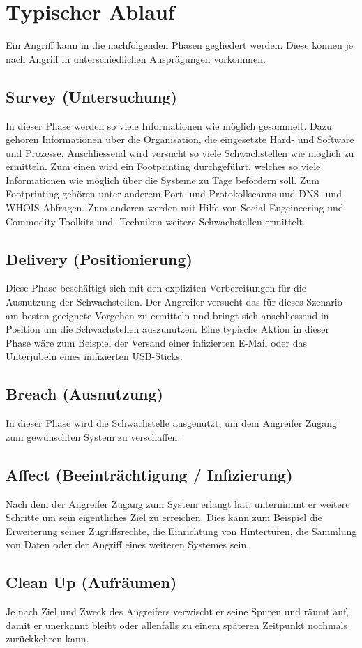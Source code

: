 \section{Typischer Ablauf}
Ein Angriff kann in die nachfolgenden Phasen gegliedert werden. Diese können je nach Angriff in unterschiedlichen Ausprägungen vorkommen.

\subsection{Survey (Untersuchung)}
In dieser Phase werden so viele Informationen wie möglich gesammelt. Dazu gehören Informationen über die Organisation, die eingesetzte Hard- und Software und Prozesse. Anschliessend wird versucht so viele Schwachstellen wie möglich zu ermitteln. Zum einen wird ein Footprinting durchgeführt, welches so viele Informationen wie möglich über die Systeme zu Tage befördern soll. Zum Footprinting gehören unter anderem Port- und Protokollscanns und DNS- und WHOIS-Abfragen. Zum anderen werden mit Hilfe von Social Engeineering und Commodity-Toolkits und -Techniken weitere Schwachstellen ermittelt.


\subsection{Delivery (Positionierung)}
Diese Phase beschäftigt sich mit den expliziten Vorbereitungen für die Ausnutzung der Schwachstellen. Der Angreifer versucht das für dieses Szenario am besten geeignete Vorgehen zu ermitteln und bringt sich anschliessend in Position um die Schwachstellen auszunutzen. Eine typische Aktion in dieser Phase wäre zum Beispiel der Versand einer infizierten E-Mail oder das Unterjubeln eines inifizierten USB-Sticks.


\subsection{Breach (Ausnutzung)}
In dieser Phase wird die Schwachstelle ausgenutzt, um dem Angreifer Zugang zum gewünschten System zu verschaffen.

\subsection{Affect (Beeinträchtigung / Infizierung)}
Nach dem der Angreifer Zugang zum System erlangt hat, unternimmt er weitere Schritte um sein eigentliches Ziel zu erreichen. Dies kann zum Beispiel die Erweiterung seiner Zugriffsrechte, die Einrichtung von Hintertüren, die Sammlung von Daten oder der Angriff eines weiteren Systemes sein.


\subsection{Clean Up (Aufräumen)}
Je nach Ziel und Zweck des Angreifers verwischt er seine Spuren und räumt auf, damit er unerkannt bleibt oder allenfalls zu einem späteren Zeitpunkt nochmals zurückkehren kann.

